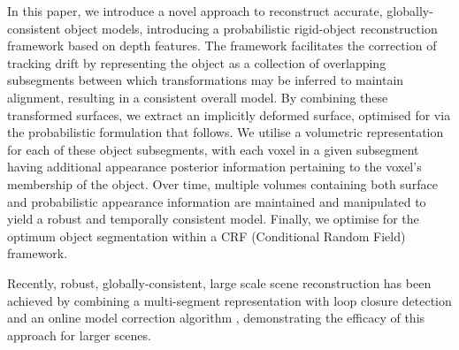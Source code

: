 
In this paper, we introduce a novel approach to reconstruct accurate, globally-consistent object models, introducing a probabilistic rigid-object reconstruction 
framework based on depth features. The framework facilitates the correction of tracking drift by representing the object as a
collection of overlapping subsegments between which transformations may be inferred to maintain alignment, resulting in a consistent
overall model. By combining these transformed surfaces, we extract an implicitly deformed surface, optimised for via the probabilistic formulation 
that follows. We utilise a volumetric representation for each of these object subsegments, with each voxel in a given subsegment having additional appearance posterior 
information pertaining to the voxel's membership of the object. Over time, multiple volumes containing both surface and probabilistic appearance information are 
maintained and manipulated to yield a robust and temporally consistent model. Finally, we optimise for the optimum object segmentation within a CRF (Conditional Random Field) framework.

Recently, robust, globally-consistent, large scale scene reconstruction has been achieved by combining a multi-segment representation with loop closure detection and an online model correction algorithm \cite{Kahler2016}, demonstrating the efficacy of this approach for larger scenes.

